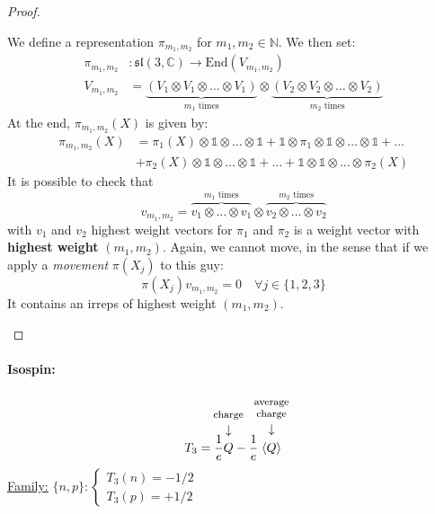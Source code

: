 \documentclass[../main.tex]{subfiles}
\begin{document}
\begin{proof}
\begin{enumerate}
We define a representation $\pi_{m_1,m_2}$ for $m_1,m_2\in\mathbb{N}$. We then set:
\begin{align*}
\pi_{m_1,m_2}&:\mathfrak{sl}(3,\mathbb{C})\xrightarrow[]{}\text{End}(V_{m_1,m_2})\\
V_{m_1,m_2}&=\underbrace{(V_1\otimes V_1\otimes\dots\otimes V_1)}_{m_1 \text{ times}}\otimes\underbrace{(V_2\otimes V_2\otimes\dots\otimes V_2)}_{m_2 \text{ times}}
\end{align*}
At the end, $\pi_{m_1,m_2}(X)$ is given by:
\begin{align*}
\pi_{m_1,m_2}(X)&=\pi_1(X)\otimes\mathbb{1}\otimes\dots\otimes\mathbb{1}+\mathbb{1}\otimes\pi_1\otimes\mathbb{1}\otimes\dots\otimes\mathbb{1}+\dots\\
&+\pi_2(X)\otimes\mathbb{1}\otimes\dots\otimes\mathbb{1}+\dots+\mathbb{1}\otimes\mathbb{1}\otimes\dots\otimes\pi_2(X)
\end{align*}
It is possible to check that 
\[
v_{m_1,m_2}=\overbrace{v_1\otimes\dots\otimes v_1}^{m_1 \textrm{ times}}\otimes \overbrace{v_2\otimes\dots\otimes v_2}^{m_2 \textrm{ times}}
\]with $v_1$ and $v_2$ highest weight vectors for $\pi_1$ and $\pi_2$ is a weight vector with \textbf{highest weight} $(m_1,m_2)$. Again, we cannot move, in the sense that if we apply a \textit{movement} $\pi(X_j)$ to this guy:
\[
\pi(X_j)v_{m_1,m_2}=0 \quad \forall j\in\{1,2,3\}
\]
It contains an irreps of highest weight $(m_1,m_2)$.
\end{enumerate}
\end{proof}
\paragraph{Isospin:}
\[
T_3=\frac{1}{e}\overset{\mathclap{\tikz \node {$\downarrow$} node [above=1.25ex] {\footnotesize charge};}}{Q}-\frac{1}{e}\overset{\mathclap{\tikz \node {$\downarrow$} node [above=1.25ex] {\footnotesize \parbox{1cm}{\centering average charge}};}}{\expval{Q}}
\]
\underline{Family:} $\{n,p\}:\begin{cases}
T_3(n)=-1/2\\
T_3(p)=+1/2
\end{cases}$
\end{document}
